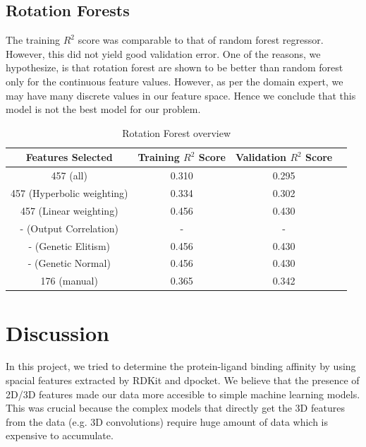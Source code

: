 \documentclass[11pt]{article}
\begin{document}
\subsection{Rotation Forests}

The training $R^2$ score was comparable to that of random forest regressor.
However, this did not yield good validation error.
One of the reasons,  we hypothesize,  is that rotation forest are shown to be better than random forest only for the continuous feature values.
However,  as per the domain expert,  we may have many discrete values in our feature space.
Hence we conclude that this model is not the best model for our problem.

\begin{table} [h!]
\centering
 \begin{tabular}{ | c | c | c | c | }
\hline
\textbf{Features Selected} & \textbf{Training $R^2$ Score} & \textbf{Validation $R^2$ Score} \\ [0.5 ex]
\hline \hline
457 (all) & 0.310 & 0.295\\
457 (Hyperbolic weighting) & 0.334 & 0.302\\
457 (Linear weighting) & 0.456 & 0.430 \\
- (Output Correlation)\footnotemark[1] & - & -  \\ 
- (Genetic Elitism) & 0.456 & 0.430 \\
- (Genetic Normal) & 0.456 & 0.430 \\
176 (manual) & 0.365  & 0.342  \\ [1ex]
\hline
\end{tabular}
\caption{Rotation Forest overview}
\label {table:4}
\end{table}

\section{Discussion}
In this project,  we tried to determine the protein-ligand binding affinity by using spacial features extracted by RDKit and dpocket.
We believe that the presence of 2D/3D features made our data more accesible to simple machine learning models. 
This was crucial because the complex models that directly get the 3D features from the data (e.g. 3D convolutions) require huge amount of data which is expensive to accumulate.
\end{document}
